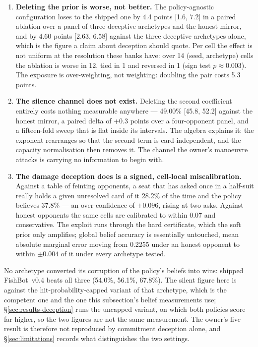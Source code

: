\documentclass[11pt]{article}
\theoremstyle{definition}
\DeclareRobustCommand{\vfour}{\texorpdfstring{\mbox{FishBot v0.4}}{FishBot v0.4}}
\providecommand{\numAgnosticCost}{4.4}
\providecommand{\numAgnosticCI}{1.6, 7.2}
\providecommand{\numPriorDoubleCost}{5.3}
\providecommand{\numPhiWin}{49.00}
\providecommand{\numPhiCI}{45.8, 52.2}
\providecommand{\numPhiPaired}{+0.3}
\providecommand{\numFeintTrue}{28.2}
\providecommand{\numFeintBelief}{37.8}
\providecommand{\numFeintBias}{0.096}
\providecommand{\numBeliefErrHonest}{0.2255}
\providecommand{\numVsFeint}{54.0}
\providecommand{\numVsSilent}{56.1}
\providecommand{\numVsWithholder}{67.8}
\providecommand{\numFeintCalib}{0.07}
\providecommand{\numBeliefErrTol}{0.004}
\providecommand{\numPriorDeleteCI}{2.63, 6.58}
\providecommand{\numPriorDeleteCost}{4.60}
\providecommand{\numPriorCells}{14}
\providecommand{\numPriorCellsWorse}{12}
\providecommand{\numPriorCellsTie}{1}
\providecommand{\numPriorCellsReversed}{1}
\providecommand{\numPriorSignP}{0.003}
\begin{document}
\begin{enumerate}
  \item \textbf{Deleting the prior is worse, not better.} The policy-agnostic
        configuration loses to the shipped one by \numAgnosticCost{} points
        [\numAgnosticCI] in a paired ablation over a panel of three deceptive
        archetypes and the honest mirror, and by \numPriorDeleteCost{} points
        [\numPriorDeleteCI] against the three deceptive archetypes alone, which
        is the figure a claim about deception should quote. Per cell the effect
        is not uniform at the resolution these banks have: over
        \numPriorCells{} (seed, archetype) cells the ablation is worse in
        \numPriorCellsWorse{}, tied in \numPriorCellsTie{} and reversed in
        \numPriorCellsReversed{} (sign test $p \approx \numPriorSignP$).
        The exposure is over-weighting, not weighting: doubling the pair costs
        \numPriorDoubleCost{} points.
  \item \textbf{The silence channel does not exist.} Deleting the second
        coefficient entirely costs nothing measurable anywhere ---
        \numPhiWin\% [\numPhiCI] against the honest mirror, a paired delta of
        \numPhiPaired{} points over a four-opponent panel, and a fifteen-fold
        sweep that is flat inside its intervals. The algebra explains it: the
        exponent rearranges so that the second term is card-independent, and the
        capacity normalisation then removes it. The channel the owner's manoeuvre
        attacks is carrying no information to begin with.
  \item \textbf{The damage deception does is a signed, cell-local
        miscalibration.} Against a table of feinting opponents, a seat that has
        asked once in a half-suit really holds a given unresolved card of it
        \numFeintTrue\% of the time and the policy believes \numFeintBelief\% ---
        an over-confidence of $+\numFeintBias$, rising at two asks. Against
        honest opponents the same cells are calibrated to within \numFeintCalib{} and
        conservative. The exploit runs through the hard certificate, which the
        soft prior only amplifies; global belief accuracy is essentially
        untouched, mean absolute marginal error moving from \numBeliefErrHonest{}
        under an honest opponent to within $\pm\numBeliefErrTol$ of it under every archetype
        tested.
\end{enumerate}

No archetype converted its corruption of the policy's beliefs into wins: shipped
\vfour{} beats all three (\numVsFeint\%, \numVsSilent\%, \numVsWithholder\%).
The silent figure here is against the hit-probability-capped variant of that
archetype, which is the competent one and the one this subsection's belief
measurements use; \S\ref{sec:results-deception} runs the uncapped variant, on
which both policies score far higher, so the two figures are not the same
measurement. The
owner's live result is therefore not reproduced by commitment deception alone,
and \S\ref{sec:limitations} records what distinguishes the two settings.
\end{document}
